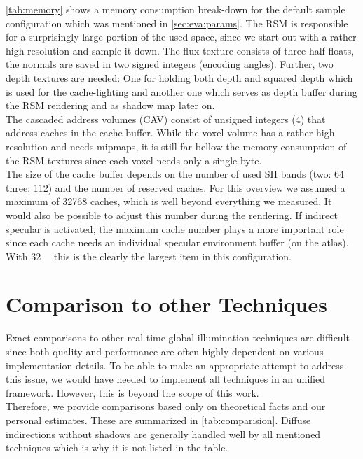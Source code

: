 \documentclass[thesis.tex]{subfiles}
\begin{document}
\autoref{tab:memory} shows a memory consumption break-down for the default sample configuration which was mentioned in \autoref{sec:eva:params}.
The RSM is responsible for a surprisingly large portion of the used space, since we start out with a rather high resolution and sample it down.
The flux texture consists of three half-floats, the normals are saved in two signed integers (encoding angles).
Further, two depth textures are needed:
One for holding both depth and squared depth which is used for the cache-lighting and another one which serves as depth buffer during the RSM rendering and as shadow map later on.
\\
The cascaded address volumes (CAV) consist of unsigned integers (\SI{4}{\byte}) that address caches in the cache buffer.
While the voxel volume has a rather high resolution and needs mipmaps, it is still far bellow the memory consumption of the RSM textures since each voxel needs only a single byte.
\\
The size of the cache buffer depends on the number of used SH bands (two: \SI{64}{\byte} three: \SI{112}{\byte}) and the number of reserved caches.
For this overview we assumed a maximum of 32768 caches, which is well beyond everything we measured.
It would also be possible to adjust this number during the rendering.
If indirect specular is activated, the maximum cache number plays a more important role since each cache needs an individual specular environment buffer (on the atlas).
With \SI{32}{\mebi\byte} this is the clearly the largest item in this configuration.

\section{Comparison to other Techniques} \label{sec:eva:comparisiontoother}
Exact comparisons to other real-time global illumination techniques are difficult since both quality and performance are often highly dependent on various implementation details.
To be able to make an appropriate attempt to address this issue, we would have needed to implement all techniques in an unified framework.
However, this is beyond the scope of this work.
\\
Therefore, we provide comparisons based only on theoretical facts and our personal estimates.
These are summarized in \autoref{tab:comparision}.
Diffuse indirections without shadows are generally handled well by all mentioned techniques which is why it is not listed in the table.
\end{document}
